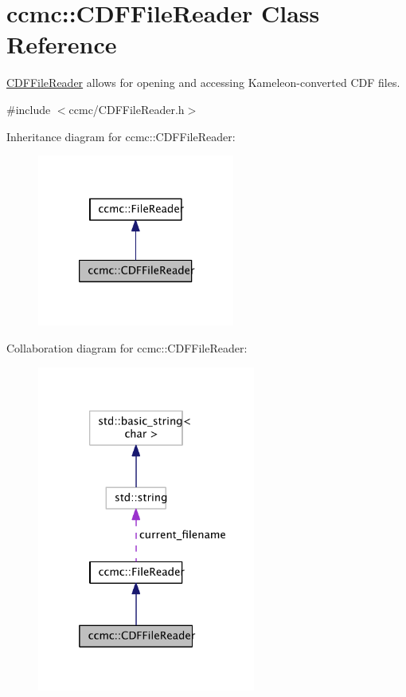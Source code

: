 \hypertarget{classccmc_1_1_c_d_f_file_reader}{\section{ccmc\-:\-:C\-D\-F\-File\-Reader Class Reference}
\label{classccmc_1_1_c_d_f_file_reader}
}


\hyperlink{classccmc_1_1_c_d_f_file_reader}{C\-D\-F\-File\-Reader} allows for opening and accessing Kameleon-\/converted C\-D\-F files.  




{\ttfamily \#include $<$ccmc/\-C\-D\-F\-File\-Reader.\-h$>$}



Inheritance diagram for ccmc\-:\-:C\-D\-F\-File\-Reader\-:\nopagebreak
\begin{figure}[H]
\begin{center}
\leavevmode
\includegraphics[width=184pt]{classccmc_1_1_c_d_f_file_reader__inherit__graph}
\end{center}
\end{figure}


Collaboration diagram for ccmc\-:\-:C\-D\-F\-File\-Reader\-:\nopagebreak
\begin{figure}[H]
\begin{center}
\leavevmode
\includegraphics[width=203pt]{classccmc_1_1_c_d_f_file_reader__coll__graph}
\end{center}
\end{figure}
